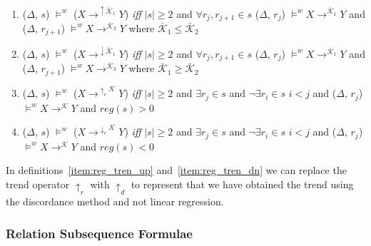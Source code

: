\begin{enumerate}

\item\label{item:ma_inc}($\Delta$, $s$) $\models^w$ ($X
\to^{\uparrow\bar{\mathcal{K}}_1} Y$) { \em iff } $\mid s \mid \ge 2$ and $ \forall r_{j},r_{j+1} \in
s$ ($\Delta$, $r_j$) 
$\models^w X \to^{\bar{\mathcal{K}}_1} Y$ and ($\Delta$, $r_{j+1}$) 
$\models^w X \to^{\bar{\mathcal{K}}_2} Y$ where $\bar{\mathcal{K}}_1 \le
\bar{\mathcal{K}}_2$



\item\label{item:ma_dec}($\Delta$, $s$) $\models^w$ ($X
\to^{\downarrow\bar{\mathcal{K}}_1} Y$) { \em iff } $\mid s \mid \ge 2$ and $ \forall r_{j},r_{j+1} \in
s$ ($\Delta$, $r_j$) 
$\models^w X \to^{\bar{\mathcal{K}}_1} Y$ and ($\Delta$, $r_{j+1}$) 
$\models^w X \to^{\bar{\mathcal{K}}_2} Y$ where $\bar{\mathcal{K}}_1 \ge
\bar{\mathcal{K}}_2$


\item\label{item:reg_tren_up}($\Delta$, $s$) $\models^w$ ($X
\to^{\uparrow_{r}\mathcal{K}} Y$) { \em iff } $\mid s \mid \ge 2$ and $\exists r_{j} \in
s$ and $\neg\exists r_i \in s$ $i < j$ and 
($\Delta$, $r_j$)  $\models^w X \to^{\mathcal{K}} Y$ and $reg(s) > 0$ 


\item\label{item:reg_tren_dn}($\Delta$, $s$) $\models^w$ ($X
\to^{\downarrow_{r}\mathcal{K}} Y$) { \em iff } $\mid s \mid \ge 2$ and $\exists r_{j} \in
s$ and $\neg\exists r_i \in s$ $i < j$ and 
($\Delta$, $r_j$)  $\models^w X \to^{\mathcal{K}} Y$ and $reg(s) < 0$ 

\end{enumerate}

In definitions~\ref{item:reg_tren_up} and~\ref{item:reg_tren_dn} we
can replace the trend operator $\uparrow_r$ with $\uparrow_d$ to
represent that we have obtained the trend using the discordance
method and not linear regression.

\subsubsection{Relation Subsequence Formulae}

